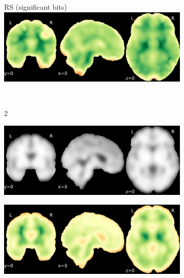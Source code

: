\documentclass{article}
\begin{document}
\begin{landscape}
\begin{figure}
\begin{subfigure}[t]{0.2\paperheight}
        \end{subfigure}
        \begin{subfigure}[t]{0.2\paperheight}
            \centering
            RS (significant bits)
            \includegraphics[width=\textwidth]{figures/sig/15mm/rs_ds001600_sub-1_sig.pdf}
        \end{subfigure} \\
        \begin{subfigure}[b][][c]{0.01\paperwidth} 2 \vspace*{15pt} \end{subfigure}
        \begin{subfigure}[t]{0.2\paperheight}
            \centering
            \includegraphics[width=\textwidth]{figures/sig/15mm/ieee_ds001771_sub-36.pdf}
        \end{subfigure}
        \begin{subfigure}[t]{0.2\paperheight}
            \centering
            \includegraphics[width=\textwidth]{figures/sig/15mm/rr_ds001771_sub-36_sig.pdf}

\end{subfigure}
\end{figure}
\end{landscape}
\end{document}
